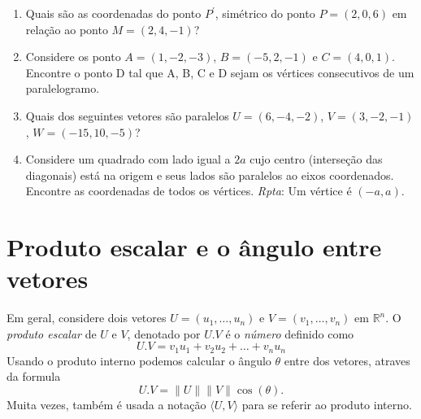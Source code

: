 \documentclass{article}
\theoremstyle{plain}
\theoremstyle{definition}
\theoremstyle{remark}
\begin{document}
\begin{enumerate}
    \item Quais são as coordenadas do ponto $P^{'}$, simétrico do ponto $P=(2,0,6)$ em relação ao ponto $M=(2, 4, -1)$?
    \item Considere os ponto $A=(1,-2,-3)$, $B=(-5,2,-1)$ e 
    $C=(4,0,1)$.
    Encontre o ponto D tal que A, B, C e D sejam os vértices 
    consecutivos de um paralelogramo. 
    \item Quais dos seguintes vetores são paralelos $U=(6,-4,-2)$, 
    $V=(3,-2,-1)$, $W=(-15,10,-5)$?
    \item Considere um quadrado com lado igual a $2a$ cujo centro 
    (interseção das diagonais) está na origem e seus lados são paralelos ao eixos coordenados. Encontre as coordenadas de todos os vértices. {\it Rpta}:
    Um vértice é $(-a,a)$.
  \end{enumerate}

\section{Produto escalar e o ângulo entre vetores}
   Em geral, considere dois vetores 
   $U=(u_1, \dots, u_n)$ e $V=(v_1, \dots, v_n)$ em $\mathbb{R}^{n}$.
   O {\it produto escalar} de $U$ e $V$, denotado por $U.V$ é o {\it número} definido como $$ U.V = v_1u_1+v_2u_2+ \dots + v_n u_n$$  
Usando o produto interno podemos calcular o ângulo $\theta$ entre dos vetores, atraves da formula $$ U.V= \|U\| \|V\| \cos(\theta).$$
Muita vezes, também é usada a notação $\langle U, V \rangle$ para
se referir ao produto interno. 
 
\end{document}
